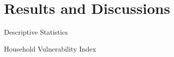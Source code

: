 \documentclass{beamer}
\begin{document}
	\section{Results and Discussions}
	\begin{frame}{Descriptive Statistics}
		\begin{block}{\centering Household Vulnerability Index}
			\begin{center}
				\begin{landscape}
					\begin{table}
						\renewcommand{\arraystretch}{1}
\end{table}
\end{landscape}
\end{center}
\end{block}
\end{frame}
\end{document}
